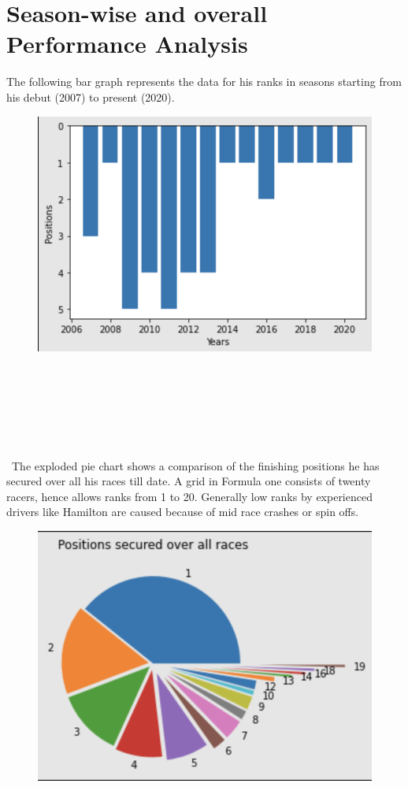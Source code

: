 \documentclass{article}
\begin{document}
\section{Season-wise and overall Performance Analysis}
The following bar graph represents the data for his ranks in seasons starting from his debut (2007) to present (2020).\\
\begin{figure}[h!]
\centering
\includegraphics[scale=0.5]{bar}
\caption{}
\label{fig:bar}
\end{figure}\\\\\\\\\\\\\
The exploded pie chart shows a comparison of the finishing positions he has secured over all his races till date. A grid in Formula one consists of twenty racers, hence allows ranks from 1 to 20. Generally low ranks by experienced drivers like Hamilton are caused because of mid race crashes or  spin offs.
\begin{figure}[h!]
\centering
\includegraphics[scale=0.6]{pie}
\caption{}
\label{fig:pie}
\end{figure}
\end{document}
